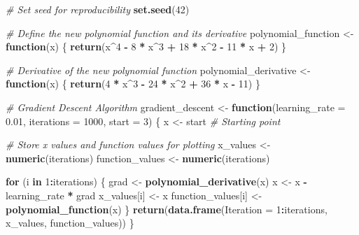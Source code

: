 \documentclass[
  12 pt,
  a4paper,
]{book}
\newenvironment{Shaded}{\begin{snugshade}}{\end{snugshade}}
\newcommand{\AttributeTok}[1]{\textcolor[rgb]{0.13,0.29,0.53}{#1}}
\newcommand{\CommentTok}[1]{\textcolor[rgb]{0.56,0.35,0.01}{\textit{#1}}}
\newcommand{\ControlFlowTok}[1]{\textcolor[rgb]{0.13,0.29,0.53}{\textbf{#1}}}
\newcommand{\DecValTok}[1]{\textcolor[rgb]{0.00,0.00,0.81}{#1}}
\newcommand{\FloatTok}[1]{\textcolor[rgb]{0.00,0.00,0.81}{#1}}
\newcommand{\FunctionTok}[1]{\textcolor[rgb]{0.13,0.29,0.53}{\textbf{#1}}}
\newcommand{\NormalTok}[1]{#1}
\newcommand{\OtherTok}[1]{\textcolor[rgb]{0.56,0.35,0.01}{#1}}
\newcommand{\SpecialCharTok}[1]{\textcolor[rgb]{0.81,0.36,0.00}{\textbf{#1}}}
\numberwithin{equation}{section}
\theoremstyle{plain}      %
\theoremstyle{definition} %
\theoremstyle{remark}     %
\theoremstyle{note}         %
\begin{document}
\begin{Shaded}
\begin{Highlighting}[]
\CommentTok{\# Set seed for reproducibility}
\FunctionTok{set.seed}\NormalTok{(}\DecValTok{42}\NormalTok{)}

\CommentTok{\# Define the new polynomial function and its derivative}
\NormalTok{polynomial\_function }\OtherTok{\textless{}{-}} \ControlFlowTok{function}\NormalTok{(x) \{}
  \FunctionTok{return}\NormalTok{(x}\SpecialCharTok{\^{}}\DecValTok{4} \SpecialCharTok{{-}} \DecValTok{8} \SpecialCharTok{*}\NormalTok{ x}\SpecialCharTok{\^{}}\DecValTok{3} \SpecialCharTok{+} \DecValTok{18} \SpecialCharTok{*}\NormalTok{ x}\SpecialCharTok{\^{}}\DecValTok{2} \SpecialCharTok{{-}} \DecValTok{11} \SpecialCharTok{*}\NormalTok{ x }\SpecialCharTok{+} \DecValTok{2}\NormalTok{)}
\NormalTok{\}}

\CommentTok{\# Derivative of the new polynomial function}
\NormalTok{polynomial\_derivative }\OtherTok{\textless{}{-}} \ControlFlowTok{function}\NormalTok{(x) \{}
  \FunctionTok{return}\NormalTok{(}\DecValTok{4} \SpecialCharTok{*}\NormalTok{ x}\SpecialCharTok{\^{}}\DecValTok{3} \SpecialCharTok{{-}} \DecValTok{24} \SpecialCharTok{*}\NormalTok{ x}\SpecialCharTok{\^{}}\DecValTok{2} \SpecialCharTok{+} \DecValTok{36} \SpecialCharTok{*}\NormalTok{ x }\SpecialCharTok{{-}} \DecValTok{11}\NormalTok{)}
\NormalTok{\}}

\CommentTok{\# Gradient Descent Algorithm}
\NormalTok{gradient\_descent }\OtherTok{\textless{}{-}} \ControlFlowTok{function}\NormalTok{(}\AttributeTok{learning\_rate =} \FloatTok{0.01}\NormalTok{, }\AttributeTok{iterations =} \DecValTok{1000}\NormalTok{, }\AttributeTok{start =} \DecValTok{3}\NormalTok{) \{}
\NormalTok{  x }\OtherTok{\textless{}{-}}\NormalTok{ start  }\CommentTok{\# Starting point}
  
  \CommentTok{\# Store x values and function values for plotting}
\NormalTok{  x\_values }\OtherTok{\textless{}{-}} \FunctionTok{numeric}\NormalTok{(iterations)}
\NormalTok{  function\_values }\OtherTok{\textless{}{-}} \FunctionTok{numeric}\NormalTok{(iterations)}
  
  \ControlFlowTok{for}\NormalTok{ (i }\ControlFlowTok{in} \DecValTok{1}\SpecialCharTok{:}\NormalTok{iterations) \{}
\NormalTok{    grad }\OtherTok{\textless{}{-}} \FunctionTok{polynomial\_derivative}\NormalTok{(x)}
\NormalTok{    x }\OtherTok{\textless{}{-}}\NormalTok{ x }\SpecialCharTok{{-}}\NormalTok{ learning\_rate }\SpecialCharTok{*}\NormalTok{ grad}
\NormalTok{    x\_values[i] }\OtherTok{\textless{}{-}}\NormalTok{ x}
\NormalTok{    function\_values[i] }\OtherTok{\textless{}{-}} \FunctionTok{polynomial\_function}\NormalTok{(x)}
\NormalTok{  \}}
  \FunctionTok{return}\NormalTok{(}\FunctionTok{data.frame}\NormalTok{(}\AttributeTok{Iteration =} \DecValTok{1}\SpecialCharTok{:}\NormalTok{iterations, x\_values, function\_values))}
\NormalTok{\}}



\end{Highlighting}
\end{Shaded}
\end{document}
